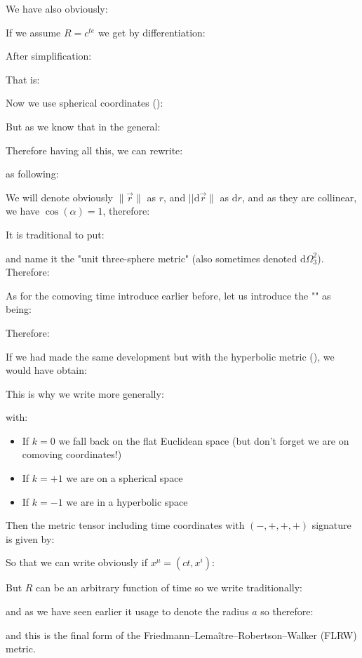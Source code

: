 	We have also obviously:
	
	If we assume $R=c^{te}$ we get by differentiation:
	
	After simplification:
	
	That is:
	
	Now we use spherical coordinates ():
	
	But as we know that in the general:
	
	Therefore having all this, we can rewrite:
	
	as following:
	
	We will denote obviously $\|\vec{r}\|$ as $r$, and $||\mathrm{d}\vec{r}\|$ as $\mathrm{d}r$, and as they are collinear, we have $\cos(\alpha)=1$, therefore:
	
	It is traditional to put:
	
	and name it the "unit three-sphere metric" (also sometimes denoted $\mathrm{d}\Omega^2_3$). Therefore:
	
	As for the comoving time introduce earlier before, let us introduce the "" as being:
	
	Therefore:
	
	If we had made the same development but with the hyperbolic metric (), we would have obtain:
	
	This is why we write more generally:
	
	with:
	\begin{itemize}
		\item If $k=0$ we fall back on the flat Euclidean space (but don't forget we are on comoving coordinates!)
		
		\item If $k=+1$ we are on a spherical space
		
		\item If $k=-1$ we are in a hyperbolic space
	\end{itemize}
	Then the metric tensor including time coordinates with $(-,+,+,+)$ signature is given by:
	
	So that we can write obviously if $x^\mu=(ct,x^i)$:
	
	But $R$ can be an arbitrary function of time so we write traditionally:
	
	and as we have seen earlier it usage to denote the radius $a$ so therefore:
	
	and this is the final form of the Friedmann–Lemaître–Robertson–Walker (FLRW) metric.
	
